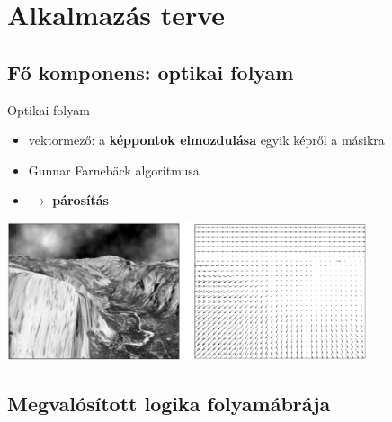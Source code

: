 \section[Terv]{Alkalmazás terve}

\subsection[A fő komponens]{Fő komponens: optikai folyam}

\begin{frame}{Optikai folyam}

\begin{itemize}
\item vektormező: a \textbf{képpontok elmozdulása} egyik képről a másikra
\item Gunnar Farnebäck algoritmusa
\item $\rightarrow$ \textbf{párosítás}
\end{itemize}

\centering
\includegraphics[width=300pt]{figures/farneback.png}

\end{frame}

\subsection[Megvalósított logika]{Megvalósított logika folyamábrája}

